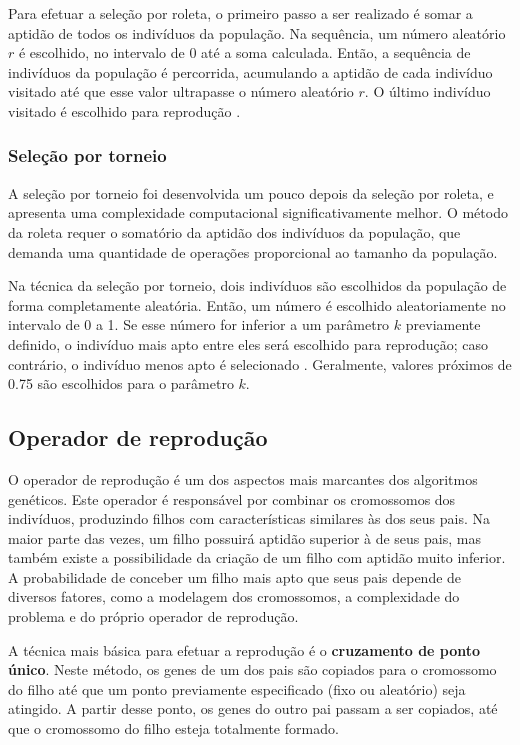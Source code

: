 \documentclass[12pt]{article}
\begin{document}
Para efetuar a seleção por roleta, o primeiro passo a ser realizado é somar a aptidão de todos os indivíduos da população. Na sequência, um número aleatório $r$ é escolhido, no intervalo de 0 até a soma calculada. Então, a sequência de indivíduos da população é percorrida, acumulando a aptidão de cada indivíduo visitado até que esse valor ultrapasse o número aleatório $r$. O último indivíduo visitado é escolhido para reprodução \cite{Mitchell1998}.

\subsubsection{Seleção por torneio} \label{sec:tournament}

A seleção por torneio foi desenvolvida um pouco depois da seleção por roleta, e apresenta uma complexidade computacional significativamente melhor. O método da roleta requer o somatório da aptidão dos indivíduos da população, que demanda uma quantidade de operações proporcional ao tamanho da população.

Na técnica da seleção por torneio, dois indivíduos são escolhidos da população de forma completamente aleatória. Então, um número é escolhido aleatoriamente no intervalo de 0 a 1. Se esse número for inferior a um parâmetro $k$ previamente definido, o indivíduo mais apto entre eles será escolhido para reprodução; caso contrário, o indivíduo menos apto é selecionado \cite{Mitchell1998}. Geralmente, valores próximos de 0.75 são escolhidos para o parâmetro $k$.

\subsection{Operador de reprodução} \label{sec:crossover}

O operador de reprodução é um dos aspectos mais marcantes dos algoritmos genéticos. Este operador é responsável por combinar os cromossomos dos indivíduos, produzindo filhos com características similares às dos seus pais. Na maior parte das vezes, um filho possuirá aptidão superior à de seus pais, mas também existe a possibilidade da criação de um filho com aptidão muito inferior. A probabilidade de conceber um filho mais apto que seus pais depende de diversos fatores, como a modelagem dos cromossomos, a complexidade do problema e do próprio operador de reprodução.

A técnica mais básica para efetuar a reprodução é o \textbf{cruzamento de ponto único}. Neste método, os genes de um dos pais são copiados para o cromossomo do filho até que um ponto previamente especificado (fixo ou aleatório) seja atingido. A partir desse ponto, os genes do outro pai passam a ser copiados, até que o cromossomo do filho esteja totalmente formado.
\end{document}
